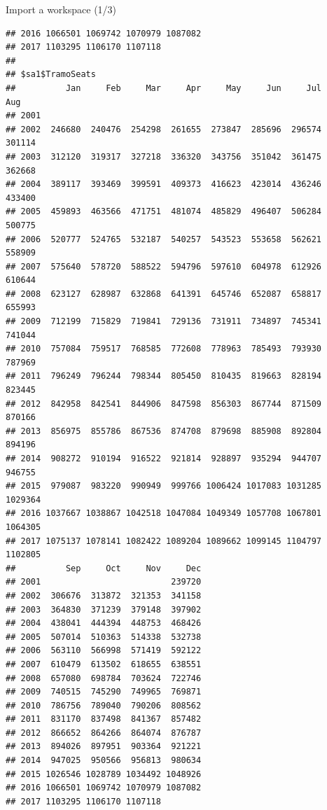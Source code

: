 \documentclass[10pt,xcolor=table,color={dvipsnames,usenames},ignorenonframetext,usepdftitle=false,french]{beamer}
\begin{document}
\begin{frame}[fragile]{Import a workspace (1/3)}
\begin{verbatim}
## 2016 1066501 1069742 1070979 1087082
## 2017 1103295 1106170 1107118        
## 
## $sa1$TramoSeats
##          Jan     Feb     Mar     Apr     May     Jun     Jul     Aug
## 2001                                                                
## 2002  246680  240476  254298  261655  273847  285696  296574  301114
## 2003  312120  319317  327218  336320  343756  351042  361475  362668
## 2004  389117  393469  399591  409373  416623  423014  436246  433400
## 2005  459893  463566  471751  481074  485829  496407  506284  500775
## 2006  520777  524765  532187  540257  543523  553658  562621  558909
## 2007  575640  578720  588522  594796  597610  604978  612926  610644
## 2008  623127  628987  632868  641391  645746  652087  658817  655993
## 2009  712199  715829  719841  729136  731911  734897  745341  741044
## 2010  757084  759517  768585  772608  778963  785493  793930  787969
## 2011  796249  796244  798344  805450  810435  819663  828194  823445
## 2012  842958  842541  844906  847598  856303  867744  871509  870166
## 2013  856975  855786  867536  874708  879698  885908  892804  894196
## 2014  908272  910194  916522  921814  928897  935294  944707  946755
## 2015  979087  983220  990949  999766 1006424 1017083 1031285 1029364
## 2016 1037667 1038867 1042518 1047084 1049349 1057708 1067801 1064305
## 2017 1075137 1078141 1082422 1089204 1089662 1099145 1104797 1102805
##          Sep     Oct     Nov     Dec
## 2001                          239720
## 2002  306676  313872  321353  341158
## 2003  364830  371239  379148  397902
## 2004  438041  444394  448753  468426
## 2005  507014  510363  514338  532738
## 2006  563110  566998  571419  592122
## 2007  610479  613502  618655  638551
## 2008  657080  698784  703624  722746
## 2009  740515  745290  749965  769871
## 2010  786756  789040  790206  808562
## 2011  831170  837498  841367  857482
## 2012  866652  864266  864074  876787
## 2013  894026  897951  903364  921221
## 2014  947025  950566  956813  980634
## 2015 1026546 1028789 1034492 1048926
## 2016 1066501 1069742 1070979 1087082
## 2017 1103295 1106170 1107118
\end{verbatim}

\end{frame}
\end{document}
